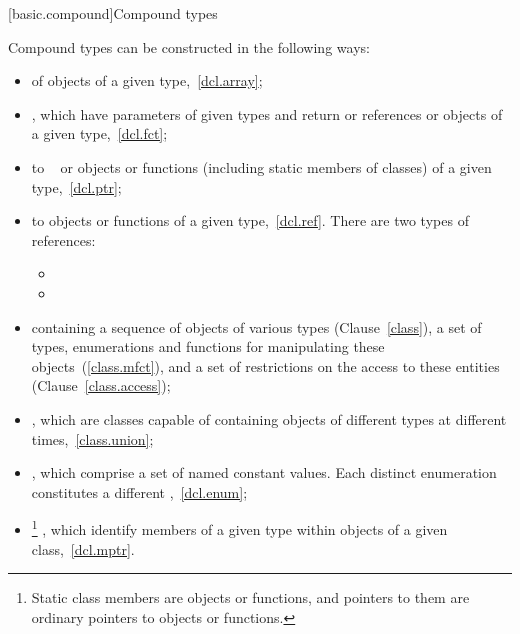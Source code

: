 [basic.compound]{Compound types}

\pnum
{}%
Compound types can be constructed in the following ways:

\begin{itemize}
\item {}%
 of objects of a given type,~\ref{dcl.array};

\item {}%
, which have parameters of given types and return
 or references or objects of a given type,~\ref{dcl.fct};

\item {}%
 to \cv\  or objects or functions (including
static members of classes) of a given type,~\ref{dcl.ptr};

\item %
%
%
%
%
%
 to objects or functions of a given
type,~\ref{dcl.ref}. There are two types of references:
\begin{itemize}
\item {}
\item {}
\end{itemize}

\item {}%
 containing a sequence of objects of various types
(Clause~\ref{class}), a set of types, enumerations and functions for
manipulating these objects~(\ref{class.mfct}), and a set of restrictions
on the access to these entities (Clause~\ref{class.access});

\item {}%
, which are classes capable of containing objects of
different types at different times,~\ref{class.union};

\item {}%
, which comprise a set of named constant values.
Each distinct enumeration constitutes a different
%
,~\ref{dcl.enum};

\item {}%
%
\footnote{Static class members are objects or functions, and pointers to them are
ordinary pointers to objects or functions.}
, which identify members of a given
type within objects of a given class,~\ref{dcl.mptr}.
\end{itemize}

